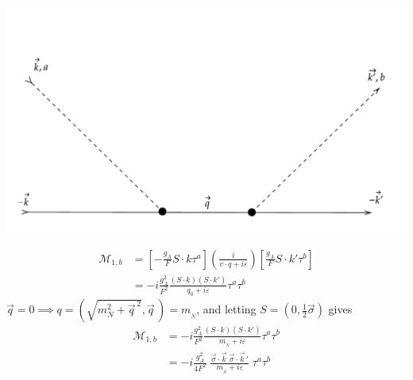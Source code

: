 \documentclass[11pt]{article}
\newcommand\mm{\mathcal{M}}
\newcommand{\mn}{m_{{}_N}}
\begin{document}
\begin{center}
    \includegraphics[scale=0.6]{1b.pdf}
\end{center}
\begin{align}
    \mm_{1,b}&=\left[-\frac{g_A}{F} S\cdot k \tau^a \right]\left( \frac{i}{v\cdot q + i \varepsilon} \right)
    \left[ \frac{g_A}{F} S\cdot k' \tau^b \right]\\
             &= -i\frac{g_A^2}{F^2}  \frac{\left( S\cdot k \right) \left( S\cdot k' \right)}{q_0 +i \varepsilon}  \tau^a \tau^b
\end{align}
$\vec{q}=0\implies q=(\sqrt{m_N^2+\vec{q}^{\,2}}, \vec{q}\,)=\mn$, and letting $S=(0,\frac{1}{2} \vec{\sigma})$ gives
\begin{align}
    \mm_{1,b}&= -i\frac{g_A^2}{F^2}  \frac{\left( S\cdot k \right) \left( S\cdot k' \right)}{\mn +i \varepsilon}  \tau^a \tau^b\\
             &= -i\frac{g_A^2}{4F^2}\; \frac{ \vec{\sigma}\cdot \vec{k}\; \vec{\sigma}\cdot \vec{k}\,' }{\mn +i \varepsilon}\; \tau^a \tau^b
\end{align}
\newpage
\end{document}
